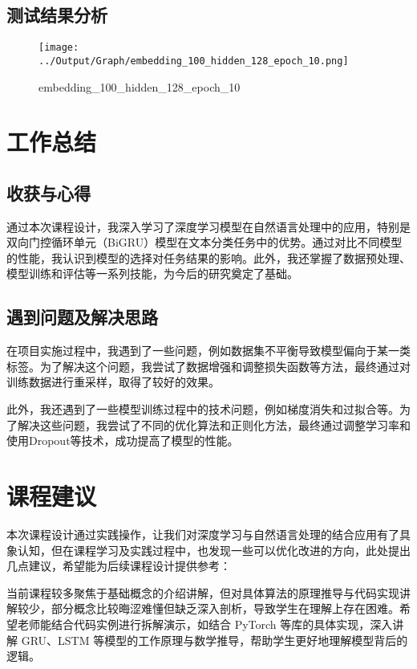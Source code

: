 \section{测试结果分析}


\begin{figure}[ht]
  \centering
  \texttt{[image: ../Output/Graph/embedding\_100\_hidden\_128\_epoch\_10.png]}
  \caption{embedding\_100\_hidden\_128\_epoch\_10}
\end{figure}




\chapter{工作总结}

\section{收获与心得}

通过本次课程设计，我深入学习了深度学习模型在自然语言处理中的应用，特别是双向门控循环单元（BiGRU）模型在文本分类任务中的优势。通过对比不同模型的性能，我认识到模型的选择对任务结果的影响。此外，我还掌握了数据预处理、模型训练和评估等一系列技能，为今后的研究奠定了基础。

\section{遇到问题及解决思路}

在项目实施过程中，我遇到了一些问题，例如数据集不平衡导致模型偏向于某一类标签。为了解决这个问题，我尝试了数据增强和调整损失函数等方法，最终通过对训练数据进行重采样，取得了较好的效果。

此外，我还遇到了一些模型训练过程中的技术问题，例如梯度消失和过拟合等。为了解决这些问题，我尝试了不同的优化算法和正则化方法，最终通过调整学习率和使用Dropout等技术，成功提高了模型的性能。

\chapter{课程建议}

本次课程设计通过实践操作，让我们对深度学习与自然语言处理的结合应用有了具象认知，但在课程学习及实践过程中，也发现一些可以优化改进的方向，此处提出几点建议，希望能为后续课程设计提供参考：

当前课程较多聚焦于基础概念的介绍讲解，但对具体算法的原理推导与代码实现讲解较少，部分概念比较晦涩难懂但缺乏深入剖析，导致学生在理解上存在困难。希望老师能结合代码实例进行拆解演示，如结合 PyTorch 等库的具体实现，深入讲解 GRU、LSTM 等模型的工作原理与数学推导，帮助学生更好地理解模型背后的逻辑。

